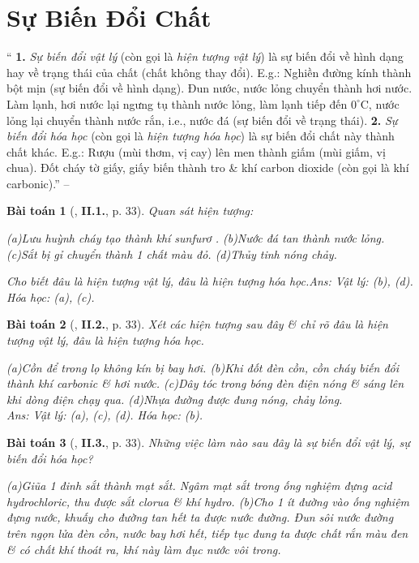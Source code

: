 \documentclass{article}
\numberwithin{equation}{section}
\newtheorem{baitoan}{Bài toán}
\begin{document}
\section{Sự Biến Đổi Chất}
``
	{\bf 1.} \textit{Sự biến đổi vật lý} (còn gọi là \textit{hiện tượng vật lý}) là sự biến đổi về hình dạng hay về trạng thái của chất (chất không thay đổi). E.g.: Nghiền đường kính thành bột mịn (sự biến đổi về hình dạng). Đun nước, nước lỏng chuyển thành hơi nước. Làm lạnh, hơi nước lại ngưng tụ thành nước lỏng, làm lạnh tiếp đến $0^\circ$C, nước lỏng lại chuyển thành nước rắn, i.e., nước đá (sự biến đổi về trạng thái).
	{\bf 2.} \textit{Sự biến đổi hóa học} (còn gọi là \textit{hiện tượng hóa học}) là sự biến đổi chất này thành chất khác. E.g.: Rượu (mùi thơm, vị cay) lên men thành giấm (mùi giấm, vị chua). Đốt cháy tờ giấy, giấy biến thành tro \& khí carbon dioxide  (còn gọi là khí carbonic).'' -- \cite[Chap. 2, p. 32]{Truong_BTNC_Hoa_Hoc_8_2022}


\begin{baitoan}[\cite{Truong_BTNC_Hoa_Hoc_8_2022}, \textbf{II.1.}, p. 33]
	Quan sát hiện tượng:
	
		(a)Lưu huỳnh cháy tạo thành khí sunfurơ \emph{}.
		(b)Nước đá tan thành nước lỏng.
		(c)Sắt bị gỉ chuyển thành 1 chất màu đỏ.
		(d)Thủy tinh nóng chảy.
	
	Cho biết đâu là hiện tượng vật lý, đâu là hiện tượng hóa học.\hfill\textsf{Ans:} Vật lý: (b), (d). Hóa học: (a), (c).
\end{baitoan}

\begin{baitoan}[\cite{Truong_BTNC_Hoa_Hoc_8_2022}, \textbf{II.2.}, p. 33]
	Xét các hiện tượng sau đây \& chỉ rõ đâu là hiện tượng vật lý, đâu là hiện tượng hóa học.
	
		(a)Cồn để trong lọ không kín bị bay hơi.
		(b)Khi đốt đèn cồn, cồn cháy biến đổi thành khí carbonic \& hơi nước.
		(c)Dây tóc trong bóng đèn điện nóng \& sáng lên khi dòng điện chạy qua.
		(d)Nhựa đường được đung nóng, chảy lỏng.
	\\\mbox{}\hfill\textsf{Ans:} Vật lý: (a), (c), (d). Hóa học: (b).
\end{baitoan}

\begin{baitoan}[\cite{Truong_BTNC_Hoa_Hoc_8_2022}, \textbf{II.3.}, p. 33]
	Những việc làm nào sau đây là sự biến đổi vật lý, sự biến đổi hóa học?
	
		(a)Giũa 1 đinh sắt thành mạt sắt. Ngâm mạt sắt trong ống nghiệm đựng acid hydrochloric, thu được sắt clorua \& khí hydro.
		(b)Cho 1 ít đường vào ống nghiệm đựng nước, khuấy cho đường tan hết ta được nước đường. Đun sôi nước đường trên ngọn lửa đèn cồn, nước bay hơi hết, tiếp tục đung ta được chất rắn màu đen \& có chất khí thoát ra, khí này làm đục nước vôi trong.
	
\end{baitoan}
\end{document}
